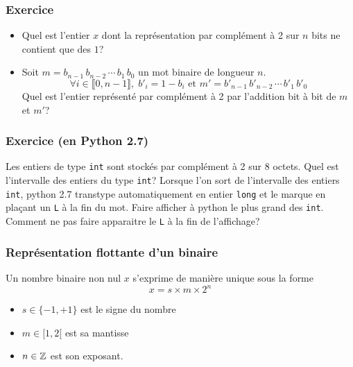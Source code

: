 \begin{frame}
  \frametitle{Exercice}
\begin{itemize}
  \item Quel est l'entier $x$ dont la représentation par complément à 2 sur $n$ bits ne contient que des $1$?
  \item Soit $m = b_{n-1}\,b_{n-2}\,\cdots\,b_1\,b_0$ un mot binaire de longueur $n$.
\begin{displaymath}
  \forall i\in \llbracket 0,n-1\rrbracket, \; b'_i = 1-b_i \text{ et } m' = b'_{n-1}\,b'_{n-2}\,\cdots\,b'_1\,b'_0
\end{displaymath}
  Quel est l'entier représenté par complément à 2 par l'addition bit à bit de $m$ et $m'$? 
\end{itemize}
\end{frame}

\begin{frame}
  \frametitle{Exercice (en Python 2.7)}
Les entiers de type \texttt{int} sont stockés par complément à 2 sur 8 octets. Quel est l'intervalle des entiers du type \texttt{int}?\newline
Lorsque l'on sort de l'intervalle des entiers \texttt{int}, python 2.7 transtype automatiquement en entier \texttt{long} et le marque en plaçant un \texttt{L} à la fin du mot. Faire afficher à python le plus grand des \texttt{int}. Comment ne pas faire apparaitre le \texttt{L} à la fin de l'affichage?
\end{frame}

\begin{frame}
  \frametitle{Représentation flottante d'un binaire}
Un nombre binaire non nul $x$ s'exprime de manière unique sous la forme
\begin{displaymath}
 x = s\times m\times 2^n 
\end{displaymath}
\begin{itemize}
  \item $s\in\{-1,+1\}$ est le signe du nombre
  \item $m\in [1,2[$ est sa mantisse
  \item $n\in \mathbb{Z}$ est son exposant.  
\end{itemize}
\end{frame}

